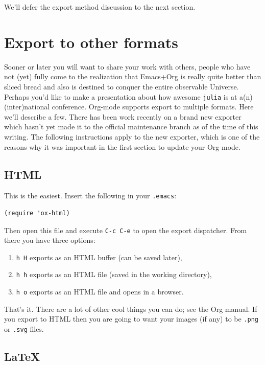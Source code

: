 \documentclass[11pt]{article}
\begin{document}
We'll defer the export method discussion to the next section.
\section[Export to other formats]{Export to other formats}
\label{sec-4}

Sooner or later you will want to share your work with others, people
who have not (yet) fully come to the realization that Emacs+Org is
really quite better than sliced bread and also is destined to conquer
the entire observable Universe.  Perhaps you'd like to make a
presentation about how awesome \texttt{julia} is at a(n) (inter)national
conference. Org-mode supports export to multiple formats.  Here we'll
describe a few.  There has been work recently on a brand new exporter
which hasn't yet made it to the official maintenance branch as of the
time of this writing.  The following instructions apply to the new
exporter, which is one of the reasons why it was important in the
first section to update your Org-mode.

\subsection[HTML]{HTML}
\label{sec-4-1}
This is the easiest. Insert the following in your \texttt{.emacs}:

\begin{verbatim}
(require 'ox-html)
\end{verbatim}

Then open this file and execute \texttt{C-c C-e} to open the export
dispatcher.  From there you have three options:

\begin{enumerate}
\item \texttt{h H} exports as an HTML buffer (can be saved later),
\item \texttt{h h} exports as an HTML file (saved in the working directory),
\item \texttt{h o} exports as an HTML file and opens in a browser.
\end{enumerate}

That's it.  There are a lot of other cool things you can do; see the
Org manual.  If you export to HTML then you are going to want your
images (if any) to be \texttt{.png} or \texttt{.svg} files.
\subsection[\LaTeX{}]{\LaTeX{}}
\label{sec-4-2}
\end{document}
